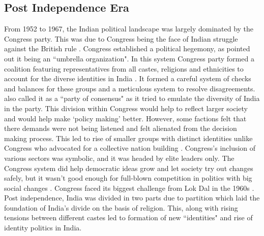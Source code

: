 \begin{sloppypar}
\subsection{Post Independence Era}
 From 1952 to 1967, the Indian political landscape was largely dominated by the Congress party. This was due to Congress being the face of Indian struggle against the British rule \citep{shastri1991nehru}. Congress established a political hegemony, as \cite{kothari1967india} pointed out it being an ``umbrella organization". In this system Congress party formed a  coalition featuring representatives from all castes, religions and ethnicities to account for the diverse identities in India \citep{anand2015downfall}. It formed a careful system of checks and balances for these groups and a meticulous system to resolve disagreements. \cite{kothari1967india} also called it as a ``party of consensus" as it tried to emulate the diversity of India in the party. This division within Congress would help to reflect larger society and would help make `policy making'  better. However, some factions felt that there demands were not being listened and felt alienated from the decision making process. This led to rise of smaller groups with distinct identities unlike Congress who advocated for a collective nation building \citep{shastri2003continuity}.  Congress’s inclusion of various sectors was symbolic, and it was headed by elite leaders only. The Congress system did help democratic ideas grow and let society try out changes safely, but it wasn’t good enough for full-blown competition in politics with big social changes \citep{shastri2009electoral}. Congress faced its biggest challenge from Lok Dal in the 1960s \citep{desouza2006india}. Post independence, India was divided in two parts due to partition which laid the foundation of India's divide on the basis of religion. This, along with rising tensions between different castes led to formation of new ``identities" and rise of identity politics in India. 


\end{sloppypar}
